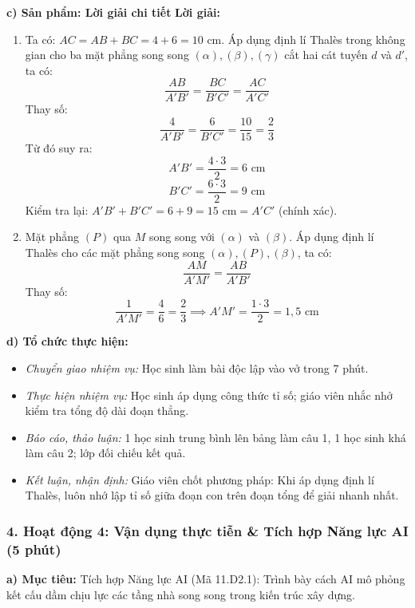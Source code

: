 \documentclass[12pt, a4paper]{article}
\begin{document}
\noindent \textbf{c) Sản phẩm: Lời giải chi tiết}
\textbf{Lời giải:}
\begin{enumerate}[leftmargin=0.6cm]
    \item Ta có: $AC = AB + BC = 4 + 6 = 10\text{ cm}$.
    Áp dụng định lí Thalès trong không gian cho ba mặt phẳng song song $(\alpha), (\beta), (\gamma)$ cắt hai cát tuyến $d$ và $d'$, ta có:
    $$\dfrac{AB}{A'B'} = \dfrac{BC}{B'C'} = \dfrac{AC}{A'C'}$$
    Thay số:
    $$\dfrac{4}{A'B'} = \dfrac{6}{B'C'} = \dfrac{10}{15} = \dfrac{2}{3}$$
    Từ đó suy ra:
    $$A'B' = \dfrac{4 \cdot 3}{2} = 6\text{ cm}$$
    $$B'C' = \dfrac{6 \cdot 3}{2} = 9\text{ cm}$$
    Kiểm tra lại: $A'B' + B'C' = 6 + 9 = 15\text{ cm} = A'C'$ (chính xác).

    \item Mặt phẳng $(P)$ qua $M$ song song với $(\alpha)$ và $(\beta)$. Áp dụng định lí Thalès cho các mặt phẳng song song $(\alpha), (P), (\beta)$, ta có:
    $$\dfrac{AM}{A'M'} = \dfrac{AB}{A'B'}$$
    Thay số:
    $$\dfrac{1}{A'M'} = \dfrac{4}{6} = \dfrac{2}{3} \implies A'M' = \dfrac{1 \cdot 3}{2} = 1{,}5\text{ cm}$$
\end{enumerate}

\noindent \textbf{d) Tổ chức thực hiện:}
\begin{itemize}[leftmargin=0.8cm]
    \item \textit{Chuyển giao nhiệm vụ:} Học sinh làm bài độc lập vào vở trong 7 phút.
    \item \textit{Thực hiện nhiệm vụ:} Học sinh áp dụng công thức tỉ số; giáo viên nhắc nhở kiểm tra tổng độ dài đoạn thẳng.
    \item \textit{Báo cáo, thảo luận:} 1 học sinh trung bình lên bảng làm câu 1, 1 học sinh khá làm câu 2; lớp đối chiếu kết quả.
    \item \textit{Kết luận, nhận định:} Giáo viên chốt phương pháp: Khi áp dụng định lí Thalès, luôn nhớ lập tỉ số giữa đoạn con trên đoạn tổng để giải nhanh nhất.
\end{itemize}

\subsubsection*{4. Hoạt động 4: Vận dụng thực tiễn & Tích hợp Năng lực AI (5 phút)}

\noindent \textbf{a) Mục tiêu:}
Tích hợp Năng lực AI (Mã 11.D2.1): Trình bày cách AI mô phỏng kết cấu dầm chịu lực các tầng nhà song song trong kiến trúc xây dựng.
\end{document}
